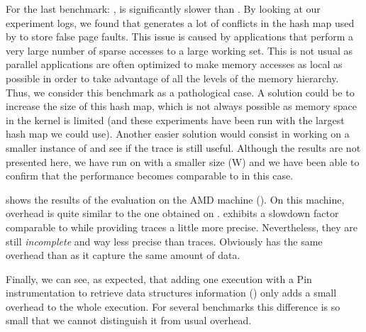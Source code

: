 For the last benchmark: \MG, \Moca is significantly slower than \TABARNAC.
By looking at our
experiment logs, we found that \MG generates a lot of conflicts in the hash map used by
\Moca to store false page faults. This issue is caused by applications that perform a very large number of sparse accesses to a large working set.
This is not usual as parallel applications are often optimized to make memory accesses as local as possible in order to take advantage of all the levels of the
memory hierarchy.
Thus, we consider this benchmark as a pathological case.
A solution could be to increase the size of
this hash map, which is not always possible as memory space in the kernel is
limited (and these experiments have been run with the largest hash map we could use). Another easier solution would consist in working on a smaller instance
of \MG and see if the trace is still useful. Although the results are not presented here, we have run \Moca on \MG with a smaller size (W) and we have been able
to confirm that the performance becomes comparable to \TABARNAC in this case.

 shows the results of the evaluation on the AMD machine
(\Stremi). On this machine, \Moca overhead is quite similar to the one
obtained on \Edel.
\MemProf exhibits a slowdown factor comparable to \Mitos while
providing traces a little more precise. Nevertheless, they are still \emph{incomplete} and
way less precise than \Moca traces. Obviously \MemProfTun has the same
overhead than \MemProf as it capture the same amount of data.

Finally, we can see, as expected, that adding one execution with a Pin
instrumentation to retrieve data structures information (\MocaPin) only adds a small overhead
to the whole \Moca execution. For several benchmarks this difference is so small that we cannot
distinguish it from \Moca usual overhead.

